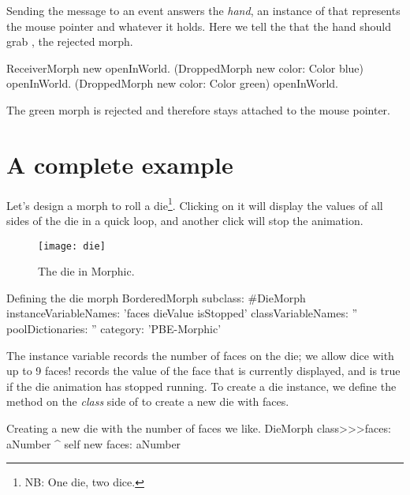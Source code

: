 \documentclass[a4paper,10pt,twoside]{book}
\begin{document}
Sending the  message to an event answers the \emph{hand}, an instance of  that represents the mouse pointer and whatever it holds.
Here we tell the  that the hand should grab , the rejected morph.

\begin{code}{}
ReceiverMorph new openInWorld.
(DroppedMorph new color: Color blue) openInWorld.
(DroppedMorph new color: Color green) openInWorld.
\end{code}
\noindent
The green morph is rejected and therefore stays attached to the mouse pointer.

\section{A complete example}

Let's design a morph to roll a die\footnote{NB: One die, two dice.}. Clicking on it will display the values of all sides of the die in a quick loop, and another click will stop the animation.

\begin{figure}[ht]
	\centerline{\texttt{[image: die]}}
	\caption{The die in Morphic.
		}
\end{figure}


\begin{classdef}{Defining the die morph}
BorderedMorph subclass: #DieMorph
	instanceVariableNames: 'faces dieValue isStopped'
	classVariableNames: ''
	poolDictionaries: ''
	category: 'PBE-Morphic'
\end{classdef}

The instance variable  records the number of faces on the die; we allow dice with up to 9 faces!  records the value of the face that is currently displayed, and  is true if the die animation has stopped running.
To create a die instance, we define the  method on the \emph{class} side of  to create a new die with  faces.
\begin{method}{Creating a new die with the number of faces we like.}
DieMorph class>>>faces: aNumber
	^ self new faces: aNumber
\end{method}
\end{document}
